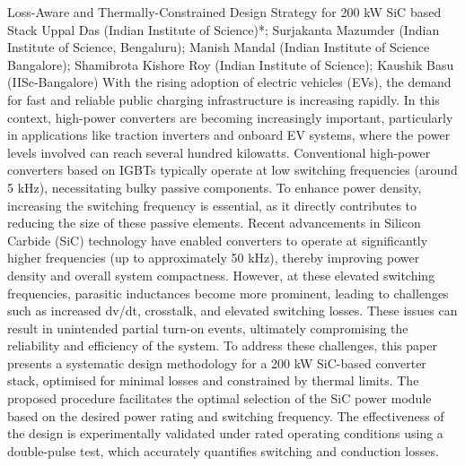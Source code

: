\begin{abstract_online}
	{Loss-Aware and Thermally-Constrained Design Strategy for 200 kW SiC based Stack}
	{Uppal Das (Indian Institute of Science)*; Surjakanta Mazumder (Indian Institute of Science, Bengaluru); Manish Mandal (Indian Institute of Science Bangalore); Shamibrota Kishore Roy (Indian Institute of Science); Kaushik Basu (IISc-Bangalore)}
	{}
	{}
	With the rising adoption of electric vehicles (EVs), the demand for fast and reliable public charging infrastructure is increasing rapidly. In this context, high-power converters are becoming increasingly important, particularly in applications like traction inverters and onboard EV systems, where the power levels involved can reach several hundred kilowatts. Conventional high-power converters based on IGBTs typically operate at low switching frequencies (around 5 kHz), necessitating bulky passive components. To enhance power density, increasing the switching frequency is essential, as it directly contributes to reducing the size of these passive elements. Recent advancements in Silicon Carbide (SiC) technology have enabled converters to operate at significantly higher frequencies (up to approximately 50 kHz), thereby improving power density and overall system compactness. However, at these elevated switching frequencies, parasitic inductances become more prominent, leading to challenges such as increased dv/dt, crosstalk, and elevated switching losses. These issues can result in unintended partial turn-on events, ultimately compromising the reliability and efficiency of the system. To address these challenges, this paper presents a systematic design methodology for a 200 kW SiC-based converter stack, optimised for minimal losses and constrained by thermal limits. The proposed procedure facilitates the optimal selection of the SiC power module based on the desired power rating and switching frequency. The effectiveness of the design is experimentally validated under rated operating conditions using a double-pulse test, which accurately quantifies switching and conduction losses.
\end{abstract_online}


